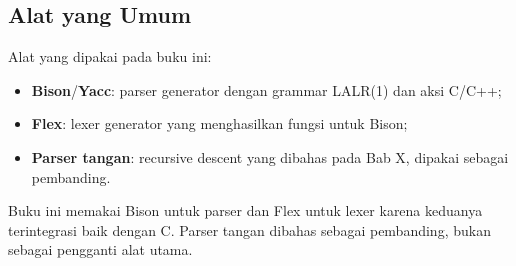 \subsection{Alat yang Umum}

Alat yang dipakai pada buku ini:
\begin{itemize}[leftmargin=*]
  \item \textbf{Bison}/\textbf{Yacc}: parser generator dengan grammar
        LALR(1) dan aksi C/C++;
  \item \textbf{Flex}: lexer generator yang menghasilkan fungsi
         untuk Bison;
  \item \textbf{Parser tangan}: recursive descent yang dibahas pada
        Bab X, dipakai sebagai pembanding.
\end{itemize}

Buku ini memakai Bison untuk parser dan Flex untuk lexer karena
keduanya terintegrasi baik dengan C. Parser tangan dibahas sebagai
pembanding, bukan sebagai pengganti alat utama.
